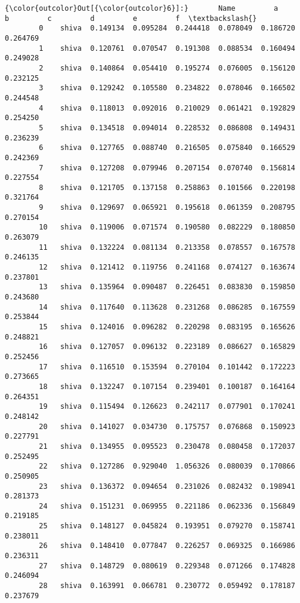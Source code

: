 \documentclass[11pt]{article}
\begin{document}
\begin{Verbatim}[commandchars=\\\{\}]
{\color{outcolor}Out[{\color{outcolor}6}]:}       Name         a         b         c         d         e         f  \textbackslash{}
        0    shiva  0.149134  0.095284  0.244418  0.078049  0.186720  0.264769   
        1    shiva  0.120761  0.070547  0.191308  0.088534  0.160494  0.249028   
        2    shiva  0.140864  0.054410  0.195274  0.076005  0.156120  0.232125   
        3    shiva  0.129242  0.105580  0.234822  0.078046  0.166502  0.244548   
        4    shiva  0.118013  0.092016  0.210029  0.061421  0.192829  0.254250   
        5    shiva  0.134518  0.094014  0.228532  0.086808  0.149431  0.236239   
        6    shiva  0.127765  0.088740  0.216505  0.075840  0.166529  0.242369   
        7    shiva  0.127208  0.079946  0.207154  0.070740  0.156814  0.227554   
        8    shiva  0.121705  0.137158  0.258863  0.101566  0.220198  0.321764   
        9    shiva  0.129697  0.065921  0.195618  0.061359  0.208795  0.270154   
        10   shiva  0.119006  0.071574  0.190580  0.082229  0.180850  0.263079   
        11   shiva  0.132224  0.081134  0.213358  0.078557  0.167578  0.246135   
        12   shiva  0.121412  0.119756  0.241168  0.074127  0.163674  0.237801   
        13   shiva  0.135964  0.090487  0.226451  0.083830  0.159850  0.243680   
        14   shiva  0.117640  0.113628  0.231268  0.086285  0.167559  0.253844   
        15   shiva  0.124016  0.096282  0.220298  0.083195  0.165626  0.248821   
        16   shiva  0.127057  0.096132  0.223189  0.086627  0.165829  0.252456   
        17   shiva  0.116510  0.153594  0.270104  0.101442  0.172223  0.273665   
        18   shiva  0.132247  0.107154  0.239401  0.100187  0.164164  0.264351   
        19   shiva  0.115494  0.126623  0.242117  0.077901  0.170241  0.248142   
        20   shiva  0.141027  0.034730  0.175757  0.076868  0.150923  0.227791   
        21   shiva  0.134955  0.095523  0.230478  0.080458  0.172037  0.252495   
        22   shiva  0.127286  0.929040  1.056326  0.080039  0.170866  0.250905   
        23   shiva  0.136372  0.094654  0.231026  0.082432  0.198941  0.281373   
        24   shiva  0.151231  0.069955  0.221186  0.062336  0.156849  0.219185   
        25   shiva  0.148127  0.045824  0.193951  0.079270  0.158741  0.238011   
        26   shiva  0.148410  0.077847  0.226257  0.069325  0.166986  0.236311   
        27   shiva  0.148729  0.080619  0.229348  0.071266  0.174828  0.246094   
        28   shiva  0.163991  0.066781  0.230772  0.059492  0.178187  0.237679   

\end{Verbatim}
\end{document}
